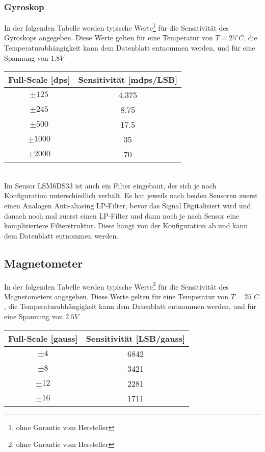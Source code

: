 \documentclass[a4paper, 12pt]{article}
\begin{document}
\subsubsection*{Gyroskop}
In der folgenden Tabelle werden typische Werte\footnote{ohne Garantie vom Hersteller} für die Sensitivität des Gyroskops angegeben.
Diese Werte gelten für eine Temperatur von $T = 25^\circ C$, die Temperaturabhängigkeit kann dem Datenblatt entnommen werden, und für eine Spannung von $1.8 V$
\begin{center}
	\begin{tabular}{c | c}
	Full-Scale [dps] & Sensitivität [mdps/LSB]\\\hline
	$\pm 125$ & 4.375\\
	$\pm 245$ & 8.75\\
	$\pm 500$ & 17.5\\
	$\pm 1000$ & 35\\
	$\pm 2000$ & 70
\end{tabular}
\end{center}
~\\
Im Sensor LSM6DS33 ist auch ein Filter eingebaut, der sich je nach Konfiguration unterschiedlich verhält. Es hat jeweils nach beiden Sensoren zuerst einen Analogen Anti-aliasing LP-Filter, bevor das Signal Digitalisiert wird und danach noch mal zuerst einen LP-Filter und dann noch je nach Sensor eine kompliziertere Filterstruktur. Diese hängt von der Konfiguration ab und kann dem Datenblatt entnommen werden.

\subsection*{Magnetometer}In der folgenden Tabelle werden typische Werte\footnote{ohne Garantie vom Hersteller} für die Sensitivität des Magnetometers angegeben.
Diese Werte gelten für eine Temperatur von $T = 25^\circ C$, die Temperaturabhängigkeit kann dem Datenblatt entnommen werden, und für eine Spannung von $2.5 V$
\begin{center}
	\begin{tabular}{c | c}
		Full-Scale [gauss] & Sensitivität [LSB/gauss]\\\hline
		$\pm 4$ & 6842\\
		$\pm 8$ & 3421\\
		$\pm 12$ & 2281\\
		$\pm 16$ & 1711
	\end{tabular}
\end{center}
\end{document}
